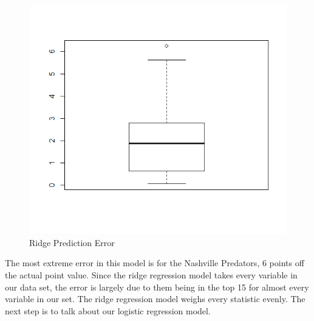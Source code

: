 \begin{figure}
	\centering
	\includegraphics[width=0.7\linewidth]{RidgePredictionError}
	\caption{Ridge Prediction Error}
	\label{fig:ridgepredictionerror}
\end{figure}\newpage
The most extreme error in this model is for the Nashville Predators, 6 points off the actual point value. Since the ridge regression model takes every variable in our data set, the error is largely due to them being in the top 15 for almost every variable in our set. The ridge regression model weighs every statistic evenly. The next step is to talk about our logistic regression model.
